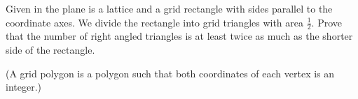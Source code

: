 Given in the plane is a lattice and a grid rectangle with sides parallel to the coordinate axes. We divide the rectangle into grid triangles with area $\frac12$. Prove that the number of right angled triangles is at least twice as much as the shorter side of the rectangle.

(A grid polygon is a polygon such that both coordinates of each vertex is an integer.)